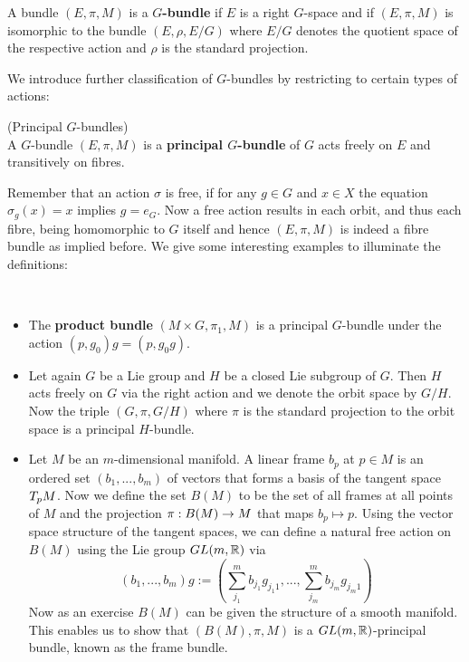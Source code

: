 \begin{definition}
  A bundle $(E,\pi,M)$ is a \textbf{$G$-bundle} if $E$ is a right $G$-space and if $(E,\pi,M)$ is isomorphic to the bundle $(E,\rho,E/G)$ where $E/G$ denotes the quotient space of the respective action and $\rho$ is the standard projection.
\end{definition}

We introduce further classification of $G$-bundles by restricting to certain types of actions:

\begin{definition} (Principal $G$-bundles)\\
  A $G$-bundle $(E,\pi,M)$ is a \textbf{principal $G$-bundle} of $G$ acts freely on $E$ and transitively on fibres.
\end{definition}

Remember that an action $\sigma$ is free, if for any $g\in G$ and $x\in X$ the equation $\sigma_g(x) = x$ implies $g = e_G$. Now a free action results in each orbit, and thus each fibre, being homomorphic to $G$ itself and hence $(E,\pi,M)$ is indeed a fibre bundle as implied before. We give some interesting examples to illuminate the definitions:

\begin{example}~
\begin{itemize}
  \item The \textbf{product bundle} $(M\times G, \pi_1, M)$ is a principal $G$-bundle under the action $(p, g_0)g = (p, g_0 g)$.

  \item Let again $G$ be a Lie group and $H$ be a closed Lie subgroup of $G$. Then $H$ acts freely on $G$ via the right action and we denote the orbit space by $G/H$. Now the triple $(G,\pi, G/H)$ where $\pi$ is the standard projection to the orbit space is a principal $H$-bundle.

  \item Let $M$ be an $m$-dimensional manifold. A linear frame $b_p$ at $p\in M$ is an ordered set $(b_1, ..., b_m)$ of vectors that forms a basis of the tangent space $T_p M$. Now we define the set $B(M)$ to be the set of all frames at all points of $M$ and the projection $\pi:B(M)\rightarrow M$ that maps $b_p \mapsto p$. Using the vector space structure of the tangent spaces, we can define a natural free action on $B(M)$ using the Lie group $GL(m,\mathbb{R})$ via
  $$ (b_1, ...,b_m)g := \left( \sum_{j_1}^m b_{j_1} g_{j_1 1}, ..., \sum_{j_m}^m b_{j_m} g_{j_m 1} \right) $$
  Now as an exercise $B(M)$ can be given the structure of a smooth manifold. This enables us to show that $(B(M), \pi, M)$ is a $GL(m,\mathbb{R})$-principal bundle, known as the frame bundle.
\end{itemize}
\end{example}

